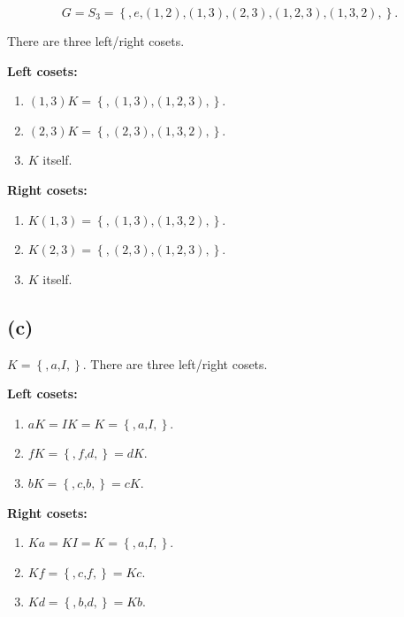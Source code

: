 \[G = S_{3} = \left\{ {,e\text{,}\left( {1,2} \right)\text{,}\left( {1,3} \right)\text{,}\left( {2,3} \right)\text{,}\left( {1,2,3} \right)\text{,}\left( {1,3,2} \right),} \right\}.\]

There are three left/right cosets.

\textbf{Left cosets:}

\begin{enumerate}
\tightlist
\item
  \(\left( {1,3} \right)K = \left\{ {,\left( {1,3} \right)\text{,}\left( {1,2,3} \right),} \right\}\).
\item
  \(\left( {2,3} \right)K = \left\{ {,\left( {2,3} \right)\text{,}\left( {1,3,2} \right),} \right\}\).
\item
  \(K\) itself.
\end{enumerate}

\textbf{Right cosets:}

\begin{enumerate}
\tightlist
\item
  \(K\left( {1,3} \right) = \left\{ {,\left( {1,3} \right)\text{,}\left( {1,3,2} \right),} \right\}\).
\item
  \(K\left( {2,3} \right) = \left\{ {,\left( {2,3} \right)\text{,}\left( {1,2,3} \right),} \right\}\).
\item
  \(K\) itself.
\end{enumerate}

\subsection{(c)}

\(K = \left\{ {,a\text{,}I,} \right\}\). There are three left/right cosets.

\textbf{Left cosets:}

\begin{enumerate}
\tightlist
\item
  \(aK = IK = K = \left\{ {,a\text{,}I,} \right\}\).
\item
  \(fK = \left\{ {,f\text{,}d,} \right\} = dK\).
\item
  \(bK = \left\{ {,c\text{,}b,} \right\} = cK\).
\end{enumerate}

\textbf{Right cosets:}

\begin{enumerate}
\tightlist
\item
  \(Ka = KI = K = \left\{ {,a\text{,}I,} \right\}\).
\item
  \(Kf = \left\{ {,c\text{,}f,} \right\} = Kc\).
\item
  \(Kd = \left\{ {,b\text{,}d,} \right\} = Kb\).
\end{enumerate}

